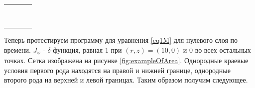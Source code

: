 \begin{table}
\begin{tabularx}{1.0\textwidth}{| >{\raggedright\arraybackslash}X | >{\raggedright\arraybackslash}X | >{\raggedright\arraybackslash}X |>{\raggedright\arraybackslash}X |}
		\centering{(20,0008; -80)} & \centering{-2.12202745E+004}& \centering{1.96202105E+004} & \centering{1.22621411E+001} \tabularnewline \hline
		\centering{(40,0006; -80)} & \centering{5.53861996E+003} & \centering{8.73866796E+003} & \centering{2.73079278E+000} \tabularnewline \hline
		\centering{(60,0004; -80)} & \centering{-1.45410075E+003} & \centering{3.34593125E+003} & \centering{6.97064363E-001} \tabularnewline \hline
		\centering{(80,0002; -80)} & \centering{4.02254968E+002} & \centering{6.80227097E+003} & \centering{1.06285218E+000} \tabularnewline \hline
		\centering{(100; -80)} & \centering{-1.97924358E+002} & \centering{7.80207564E+003} & \centering{9.75259455E-001} \tabularnewline \hline
		
		\centering{(20,0008; -100)} & \centering{-2.64659667E+004}& \centering{2.44658867E+004} & \centering{1.22324541E+001} \tabularnewline \hline
		\centering{(40,0006; -100)} & \centering{6.90817680E+003} & \centering{1.09082368E+004} & \centering{2.72701830E+000} \tabularnewline \hline
		\centering{(60,0004; -100)} & \centering{-1.81376823E+003} & \centering{4.18627177E+003} & \centering{6.97707310E-001} \tabularnewline \hline
		\centering{(80,0002; -100)} & \centering{5.01783996E+002} & \centering{8.50180400E+003} & \centering{1.06272284E+000} \tabularnewline \hline
		\centering{(100; -100)} & \centering{-2.46908390E+002} & \centering{9.75309161E+003} & \centering{9.75309161E-001} \tabularnewline \hline
		
	\end{tabularx}
	\label{tab:test2b}
\end{table}



\newpage

Теперь протестируем программу для уравнения \ref{eq1M} для нулевого слоя по времени. $J_{\varphi}$ - $\delta$-функция, равная 1 при $(r, z) = (10, 0)$ и 0 во всех остальных точках. Сетка изображена на рисунке \ref{fig:exampleOfArea}. Однородные краевые условия первого рода находятся на правой и нижней границе, однородные второго рода на верхней и левой границах. Таким образом получим следующее. 


